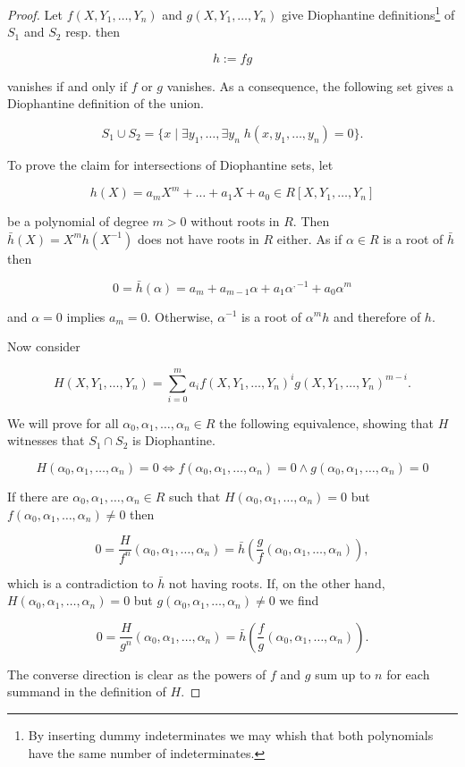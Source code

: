 \begin{proof}
Let $f(X, Y_1, …, Y_n)$ and $g(X, Y_1, …, Y_n)$ give Diophantine
definitions\footnote{By inserting dummy indeterminates we may whish that
both polynomials have the same number of indeterminates.} of $S_1$
and $S_2$ resp. then

\[ h := fg \]

vanishes if and only if $f$ or $g$ vanishes. As a consequence, the
following set gives a Diophantine definition of the union.

\[ S_1 ∪ S_2 = \lbrace x \mid ∃ y_1, … , ∃ y_n \; h(x, y_1, … , y_n) = 0 \rbrace. \]

To prove the claim for intersections of Diophantine sets, let

\[h(X) = a_m X^m + … + a_1 X + a_0 ∈ R[X, Y_1, …, Y_n]\]

be a polynomial of degree $m > 0$ without roots in $R$. Then
$\bar h(X) = X^m h(X^{-1})$ does not have roots in $R$ either. As if
$α ∈ R$ is a root of $\bar h$ then

\[ 0 = \bar h(α) = a_m + a_{m-1} α + a_1 α^{,-1} + a_0 α^m\]

and $α = 0$ implies $a_m = 0$. Otherwise, $α^{-1}$ is a root of
$α^m h$ and therefore of $h$.

Now consider

\[ H(X, Y_1, …, Y_n) = \sum_{i=0}^m a_i f(X, Y_1, …, Y_n)^i g(X, Y_1, …, Y_n)^{m - i}.\]

We will prove for all $α_0, α_1, …, α_n ∈ R$ the following
equivalence, showing that $H$ witnesses that $S_1 ∩ S_2$ is
Diophantine.

\[ H(α_0, α_1, …, α_n) = 0 \Leftrightarrow f(α_0, α_1, …, α_n) = 0 ∧ g(α_0, α_1, …, α_n) = 0 \]

If there are $α_0, α_1, …, α_n ∈ R$ such that
$H(α_0, α_1, …, α_n) = 0$ but $f(α_0, α_1, …, α_n) ≠ 0$ then

\[ 0 = \frac H {f^n} (α_0, α_1, …, α_n) = \bar h \left(\frac gf (α_0, α_1, …, α_n) \right), \]

which is a contradiction to $\bar h$ not having roots. If, on the
other hand, $H(α_0, α_1, …, α_n) = 0$ but $g(α_0, α_1, …, α_n) ≠ 0$
we find

\[ 0 = \frac H {g^n}(α_0, α_1, …, α_n) = \bar h \left( \frac fg (α_0, α_1, …, α_n) \right). \]

The converse direction is clear as the powers of $f$ and $g$ sum up
to $n$ for each summand in the definition of $H$.
\end{proof}

